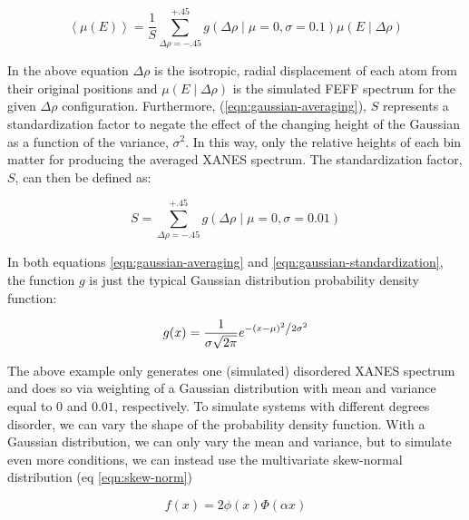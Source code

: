 \begin{equation}
	\label{eqn:gaussian-averaging}
	\left\langle \mu(E) \right\rangle  = \frac{1}{S} \sum_{\Delta\rho=-.45}^{+.45} g\left(\Delta \rho \mid \mu=0, \sigma=0.1\right) \mu(E \mid \Delta\rho)
\end{equation}

\noindent
In the above equation $ \Delta\rho $ is the isotropic, radial displacement of each atom from their original positions and $ \mu(E \mid \Delta\rho) $ is the simulated FEFF spectrum for the given $ \Delta\rho $ configuration. Furthermore, (\ref{eqn:gaussian-averaging}), $ S $ represents a standardization factor to negate the effect of the changing height of the Gaussian as a function of the variance, $ \sigma^2 $. In this way, only the relative heights of each bin matter for producing the averaged XANES spectrum. The standardization factor, $ S $, can then be defined as:

\begin{equation}
	\label{eqn:gaussian-standardization}
	S = \sum_{\Delta\rho=-.45}^{+.45} g\left(\Delta \rho \mid \mu=0, \sigma=0.01\right)
\end{equation}

\noindent
In both equations \ref{eqn:gaussian-averaging} and \ref{eqn:gaussian-standardization}, the function $ g $ is just the typical Gaussian distribution probability density function: 

\begin{equation}
	\label{eqn:gaussian}
	g(x) = \frac{1}{{\sigma \sqrt {2\pi } }}e^{{{ - \left( {x - \mu } \right)^2 } \mathord{\left/ {\vphantom {{ - \left( {x - \mu } \right)^2 } {2\sigma ^2 }}} \right. \kern-\nulldelimiterspace} {2\sigma ^2 }}}
\end{equation}

The above example only generates one (simulated) disordered XANES spectrum and does so via weighting of a Gaussian distribution with mean and variance equal to $ 0 $ and $ 0.01 $, respectively. To simulate systems with different degrees disorder, we can vary the shape of the probability density function. With a Gaussian distribution, we can only vary the mean and variance, but to simulate even more conditions, we can instead use the multivariate skew-normal distribution (eq \ref{eqn:skew-norm}) \cite{skewnorm_Azzalini_1999, 2020SciPy-NMeth}

\begin{equation}
	\label{eqn:skew-norm}
	f(x)=2\phi (x)\Phi (\alpha x)
\end{equation}
 

